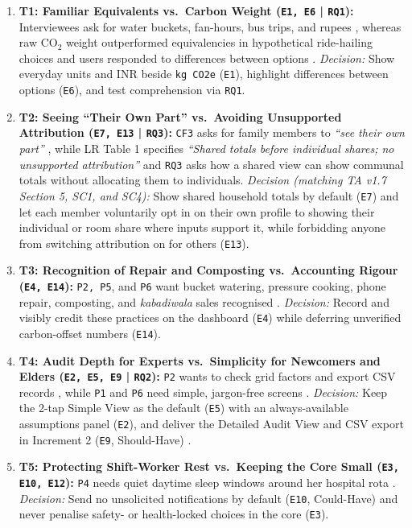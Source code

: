 \documentclass[12pt, a4paper]{article}
\begin{document}
\begin{enumerate}
    \item \textbf{T1: Familiar Equivalents vs.\ Carbon Weight (\texttt{E1, E6} | \texttt{RQ1}):} Interviewees ask for water buckets, fan-hours, bus trips, and rupees \cite{cf1,cf6,cf8}, whereas raw $\text{CO}_2$ weight outperformed equivalencies in hypothetical ride-hailing choices and users responded to differences between options \cite{mohanty2023}. \textit{Decision:} Show everyday units and INR beside \texttt{kg CO2e} (\texttt{E1}), highlight differences between options (\texttt{E6}), and test comprehension via \texttt{RQ1}.
    \item \textbf{T2: Seeing ``Their Own Part'' vs.\ Avoiding Unsupported Attribution (\texttt{E7, E13} | \texttt{RQ3}):} \texttt{CF3} asks for family members to \textit{``see their own part''} \cite{cf3}, while LR Table 1 specifies \textit{``Shared totals before individual shares; no unsupported attribution''} and \texttt{RQ3} asks how a shared view can show communal totals without allocating them to individuals. \textit{Decision (matching TA v1.7 Section 5, SC1, and SC4):} Show shared household totals by default (\texttt{E7}) and let each member voluntarily opt in on their own profile to showing their individual or room share where inputs support it, while forbidding anyone from switching attribution on for others (\texttt{E13}).
    \item \textbf{T3: Recognition of Repair and Composting vs.\ Accounting Rigour (\texttt{E4, E14}):} \texttt{P2, P5}, and \texttt{P6} want bucket watering, pressure cooking, phone repair, composting, and \textit{kabadiwala} sales recognised \cite{cf3,cf4,cf8}. \textit{Decision:} Record and visibly credit these practices on the dashboard (\texttt{E4}) while deferring unverified carbon-offset numbers (\texttt{E14}).
    \item \textbf{T4: Audit Depth for Experts vs.\ Simplicity for Newcomers and Elders (\texttt{E2, E5, E9} | \texttt{RQ2}):} \texttt{P2} wants to check grid factors and export CSV records \cite{cf4}, while \texttt{P1} and \texttt{P6} need simple, jargon-free screens \cite{cf1,cf8}. \textit{Decision:} Keep the 2-tap Simple View as the default (\texttt{E5}) with an always-available assumptions panel (\texttt{E2}), and deliver the Detailed Audit View and CSV export in Increment 2 (\texttt{E9}, Should-Have) \cite{hoffmann2024}.
    \item \textbf{T5: Protecting Shift-Worker Rest vs.\ Keeping the Core Small (\texttt{E3, E10, E12}):} \texttt{P4} needs quiet daytime sleep windows around her hospital rota \cite{cf9}. \textit{Decision:} Send no unsolicited notifications by default (\texttt{E10}, Could-Have) and never penalise safety- or health-locked choices in the core (\texttt{E3}).
\end{enumerate}
\end{document}
